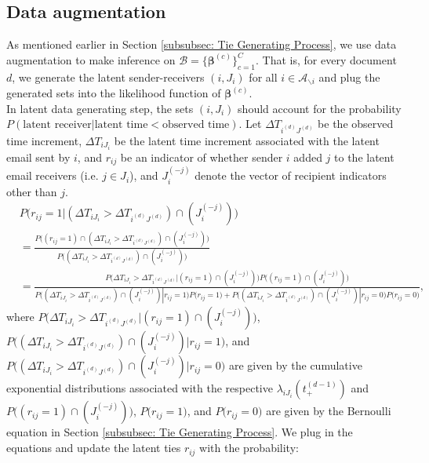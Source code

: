 \documentclass[a4paper]{article}
\begin{document}
  \subsection{Data augmentation} \label{subsec: Data augmentation}
  As mentioned earlier in Section \ref{subsubsec: Tie Generating Process}, we use data augmentation to make inference on $\mathcal{B}=\{\boldsymbol{\beta}^{(c)} \}_{c=1}^{C}$. That is, for every document $d$, we generate the latent sender-receivers $(i, J_i)$ for all $i \in \mathcal{A}_{\backslash i}$ and plug the generated sets into the likelihood function of $\boldsymbol{\beta}^{(c)}$. \\\newline
In latent data generating step, the sets $(i, J_i)$ should account for the probability $P(\mbox{latent receiver}| \mbox{latent time} < \mbox{observed time})$. Let $\Delta T_{i^{(d)}{J^{(d)}}}$ be the observed time increment, $\Delta T_{i{J_i}}$ be the latent time increment associated with the latent email sent by $i$, and $r_{ij}$ be an indicator of whether sender $i$ added $j$ to the latent email receivers (i.e. $j \in J_i$), and $J_i^{(-j)}$ denote the vector of recipient indicators other than $j$. 
  \begin{equation}
  \begin{split}
&P\Big(r_{ij}=1|(\Delta T_{i{J_i}} > \Delta T_{i^{(d)}{J^{(d)}}})\cap( J_i^{(-j)})\Big)\\ &=\frac{P\Big((r_{ij}=1)\cap (\Delta T_{i{J_i}} > \Delta T_{i^{(d)}{J^{(d)}}})\cap (J_i^{(-j)})\Big)}{P\Big((\Delta T_{i{J_i}} > \Delta T_{i^{(d)}{J^{(d)}}})\cap (J_i^{(-j)})\Big)}\\
& = \frac{P\Big(\Delta T_{i{J_i}} > \Delta T_{i^{(d)}{J^{(d)}}} | (r_{ij}=1)\cap (J_i^{(-j)})\Big)P\Big((r_{ij}=1) \cap (J_i^{(-j)})\Big)}{P\Big((\Delta T_{i{J_i}} > \Delta T_{i^{(d)}{J^{(d)}}})\cap (J_i^{(-j)})|r_{ij}=1\Big)P\Big(r_{ij}=1\Big)+P\Big( (\Delta T_{i{J_i}} > \Delta T_{i^{(d)}{J^{(d)}}}) \cap (J_i^{(-j)})|r_{ij}=0\Big)P\Big(r_{ij}=0\Big)},
  \end{split}
  \end{equation}
  where $P\Big(\Delta T_{i{J_i}} > \Delta T_{i^{(d)}{J^{(d)}}} | (r_{ij}=1)\cap (J_i^{(-j)})\Big)$, $P\Big((\Delta T_{i{J_i}}> \Delta T_{i^{(d)}{J^{(d)}}})\cap (J_i^{(-j)})|r_{ij}=1\Big)$, and $P\Big((\Delta T_{i{J_i}}> \Delta T_{i^{(d)}{J^{(d)}}})\cap (J_i^{(-j)})|r_{ij}=0\Big)$ are given by the cumulative exponential distributions associated with the respective $\lambda_{iJ_i}(t_+^{(d-1)})$ and $P\Big((r_{ij}=1) \cap (J_i^{(-j)})\Big)$,  $P\Big(r_{ij}=1\Big)$, and $P\Big(r_{ij}=0\Big)$ are given by the Bernoulli equation in Section \ref{subsubsec: Tie Generating Process}. We plug in the equations and update the latent ties $r_{ij}$ with the probability:
\end{document}
